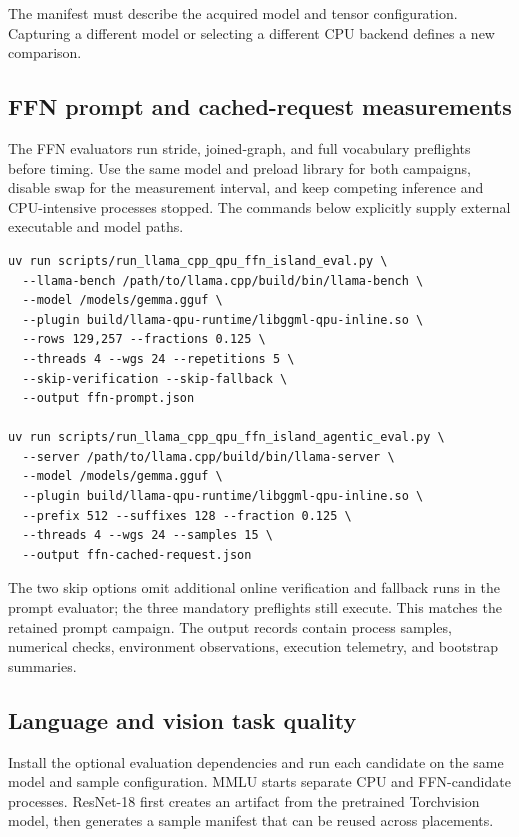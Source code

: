 \documentclass[sigplan,screen,review]{acmart}
\begin{document}
The manifest must describe the acquired model and tensor configuration. Capturing a different model or selecting a different CPU backend defines a new comparison.

\subsection{FFN prompt and cached-request measurements}

The FFN evaluators run stride, joined-graph, and full vocabulary preflights before timing. Use the same model and preload library for both campaigns, disable swap for the measurement interval, and keep competing inference and CPU-intensive processes stopped. The commands below explicitly supply external executable and model paths.

{\footnotesize
\begin{verbatim}
uv run scripts/run_llama_cpp_qpu_ffn_island_eval.py \
  --llama-bench /path/to/llama.cpp/build/bin/llama-bench \
  --model /models/gemma.gguf \
  --plugin build/llama-qpu-runtime/libggml-qpu-inline.so \
  --rows 129,257 --fractions 0.125 \
  --threads 4 --wgs 24 --repetitions 5 \
  --skip-verification --skip-fallback \
  --output ffn-prompt.json

uv run scripts/run_llama_cpp_qpu_ffn_island_agentic_eval.py \
  --server /path/to/llama.cpp/build/bin/llama-server \
  --model /models/gemma.gguf \
  --plugin build/llama-qpu-runtime/libggml-qpu-inline.so \
  --prefix 512 --suffixes 128 --fraction 0.125 \
  --threads 4 --wgs 24 --samples 15 \
  --output ffn-cached-request.json
\end{verbatim}
}

The two skip options omit additional online verification and fallback runs in the prompt evaluator; the three mandatory preflights still execute. This matches the retained prompt campaign. The output records contain process samples, numerical checks, environment observations, execution telemetry, and bootstrap summaries.

\subsection{Language and vision task quality}

Install the optional evaluation dependencies and run each candidate on the same model and sample configuration. MMLU starts separate CPU and FFN-candidate processes. ResNet-18 first creates an artifact from the pretrained Torchvision model, then generates a sample manifest that can be reused across placements.
\end{document}
